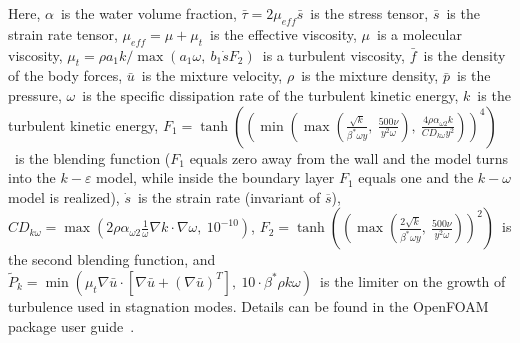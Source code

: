 \documentclass[mathematics,article,accept,pdftex,moreauthors]{Definitions/mdpi}
\begin{document}
Here, $\alpha$~is the water volume fraction, $\bar{ {\tau}} = 2 \mu_{eff} \bar{ {s}}$~is the stress tensor, $\bar{ {s}}$~is the strain rate tensor, $\mu_{eff} = \mu + \mu_t$~is the effective viscosity, $\mu$~is a molecular viscosity, $\mu_t = \rho a_1 k / \max(a_1 \omega, \ b_1 \dot{s} F_2)$~is a turbulent viscosity, $\bar{ {f}}$~is the density of the body forces, $\bar{ {u}}$~is the mixture velocity, $\rho$~is the mixture density, $\bar{p}$~is the pressure, $\omega$~is the specific dissipation rate of the turbulent kinetic energy, $k$~is the turbulent kinetic energy, $F_1 = \tanh \left( \left( \min\left( \max \left( \frac{\sqrt{k}}{\beta^* \omega y},\ \frac{500 \nu}{y^2 \omega} \right),\ \frac{4 \rho \alpha_{\omega 2} k}{CD_{k \omega} y^2} \right) \right)^4 \right)$~is the blending function ($F_1$ equals zero away from the wall and the model turns into the $k-\varepsilon$ model, while inside the boundary layer $F_1$ equals one and the $k-\omega$ model is realized),  $\dot{s}$~is the strain rate (invariant of $\overline{ {s}}$), $CD_{k\omega} = \max \left( 2 \rho \alpha_{\omega 2} \frac{1}{\omega}  {\nabla} k \cdot  {\nabla} \omega,\ 10^{-10} \right)$, $F_2 = \tanh \left( \left( \max \left( \frac{2 \sqrt{k}}{\beta^* \omega y},\ \frac{500 \nu}{y^2 \omega} \right) \right)^2 \right)$~is the second blending function, and $\widetilde{P}_k = \min (\mu_t  {\nabla} \bar{ {u}} \cdot \left[  {\nabla} \bar{ {u}} + ( {\nabla} \bar{ {u}})^T\right],\ 10 \cdot \beta^* \rho k \omega)$~is the limiter on the growth of turbulence used in stagnation modes. Details can be found in the OpenFOAM package user guide~\cite{OFUG}.
\end{document}
